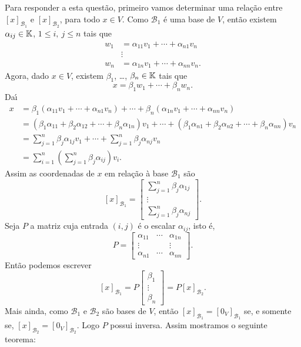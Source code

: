 Para responder a esta quest\~ao, primeiro vamos determinar uma rela\c{c}\~ao entre $[x]_{\mathcal{B}_1}$ e $[x]_{\mathcal{B}_2}$, para todo $x \in V$. Como $\mathcal{B}_1$ \'e uma base de $V$, ent\~ao existem $\alpha_{ij} \in \mathbb{K}$, $1 \le i,\ j \le n$ tais que
\begin{align*}
  w_1 &= \alpha_{11}v_1 + \cdots + \alpha_{n1}v_n\\
  &\vdots\\
  w_n &= \alpha_{1n}v_1 + \cdots + \alpha_{nn}v_n.
\end{align*}
Agora, dado $x \in V$, existem $\beta_1$, \dots, $\beta_n \in \mathbb{K}$ tais que
\[
  x = \beta_1w_1 + \cdots + \beta_nw_n.
\]
Da{\'\i}
\begin{align*}
  x &= \beta_1(\alpha_{11}v_1 + \cdots + \alpha_{n1}v_n) + \cdots + \beta_n(\alpha_{1n}v_1 + \cdots + \alpha_{nn}v_n)\\
  &= (\beta_1\alpha_{11} + \beta_2\alpha_{12} + \cdots + \beta_n\alpha_{1n})v_1 + \cdots + (\beta_1\alpha_{n1} + \beta_2\alpha_{n2} + \cdots + \beta_n\alpha_{nn})v_n\\
  &= \sum_{j=1}^n\beta_j\alpha_{1j}v_1 + \cdots + \sum_{j=1}^n\beta_j\alpha_{nj}v_n\\
  &= \sum_{i=1}^n\left(\sum_{j=1}^n\beta_j\alpha_{ij}\right)v_i.
\end{align*}
Assim as coordenadas de $x$ em rela\c{c}\~ao \`a base $\mathcal{B}_1$ s\~ao
\[
  [x]_{\mathcal{B}_1} = \begin{bmatrix}
    \sum_{j=1}^n\beta_j\alpha_{1j}\\
    \vdots\\
    \sum_{j=1}^n\beta_j\alpha_{nj}
  \end{bmatrix}.
\]
Seja $P$ a matriz cuja entrada $(i,j)$ \'e o escalar $\alpha_{ij}$, isto \'e,
\[
  P = \begin{bmatrix}
    \alpha_{11} & \cdots & \alpha_{1n}\\
    \vdots & & \vdots\\
    \alpha_{n1} & \cdots & \alpha_{nn}
  \end{bmatrix}.
\]
Ent\~ao podemos escrever
\[
  [x]_{\mathcal{B}_1} = P \begin{bmatrix}
    \beta_1\\
    \vdots\\
    \beta_n
  \end{bmatrix} = P[x]_{\mathcal{B}_2}.
\]
Mais ainda, como $\mathcal{B}_1$ e $\mathcal{B}_2$ s\~ao bases de $V$, ent\~ao $[x]_{\mathcal{B}_1} = [0_V]_{\mathcal{B}_1}$ se, e somente se, $[x]_{\mathcal{B}_2} = [0_V]_{\mathcal{B}_2}$. Logo $P$ possui inversa. Assim mostramos o seguinte teorema:

